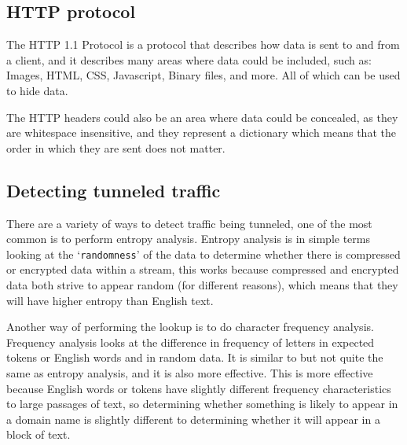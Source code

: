 \subsection{HTTP protocol}
The HTTP 1.1 Protocol\cite{rfc2616} is a protocol that describes how data is sent to and from a client, and it describes many areas where data could be included, such as:
Images,
HTML,
CSS,
Javascript,
Binary files,
and more.
All of which can be used to hide data.\par
The HTTP headers could also be an area where data could be concealed, as they are whitespace insensitive, and they represent a dictionary which means that the order in which they are sent does not matter.

\subsection{Detecting tunneled traffic}
There are a variety of ways to detect traffic being tunneled, one of the most common is to perform entropy analysis\cite{detectingdns}.
Entropy analysis is in simple terms looking at the `\texttt{randomness}' of the data to determine whether there is compressed or encrypted data within a stream, this works because compressed and encrypted data both strive to appear random (for different reasons), which means that they will have higher entropy than English text.\par
Another way of performing the lookup is to do character frequency analysis\cite{freqanal}.
Frequency analysis looks at the difference in frequency of letters in expected tokens or English words and in random data. It is similar to but not quite the same as entropy analysis, and it is also more effective.
This is more effective because English words or tokens have slightly different frequency characteristics to large passages of text, so determining whether something is likely to appear in a domain name is slightly different to determining whether it will appear in a block of text.

